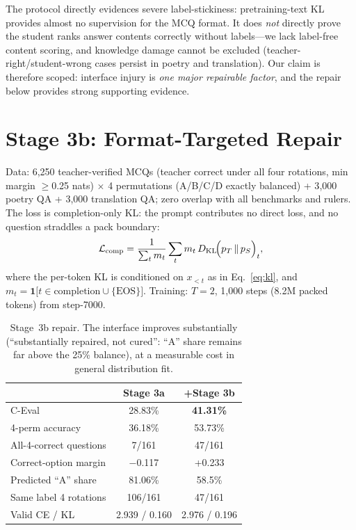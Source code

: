 \documentclass[11pt]{article}
\begin{document}
The protocol directly evidences severe label-stickiness: pretraining-text
KL provides almost no supervision for the MCQ format. It does
\emph{not} directly prove the student ranks answer contents correctly
without labels---we lack label-free content scoring, and knowledge
damage cannot be excluded (teacher-right/student-wrong cases persist in
poetry and translation). Our claim is therefore scoped: interface injury
is \emph{one major repairable factor}, and the repair below provides
strong supporting evidence.

\section{Stage 3b: Format-Targeted Repair}
\label{sec:stage3b}

Data: 6{,}250 teacher-verified MCQs (teacher correct under all four
rotations, min margin $\ge$0.25 nats) $\times$ 4 permutations (A/B/C/D
exactly balanced) + 3{,}000 poetry QA + 3{,}000 translation QA; zero
overlap with all benchmarks and rulers. The loss is completion-only KL:
the prompt contributes no direct loss, and no question straddles a pack
boundary:
\begin{equation}
\mathcal{L}_{\mathrm{comp}} = \frac{1}{\sum_t m_t} \sum_t m_t\, D_{\mathrm{KL}}\!\Bigl(p_T \,\|\, p_S\Bigr)_t,
\label{eq:comp}
\end{equation}
where the per-token KL is conditioned on $x_{<t}$ as in
Eq.~\eqref{eq:kl}, and
$m_t = \mathbf{1}\bigl[t \in \text{completion} \cup \{\mathrm{EOS}\}\bigr]$.
Training: $T{=}2$, 1{,}000 steps (8.2M packed tokens) from step-7000.

\begin{table}[t]
\centering
\small
\begin{tabular}{@{}lcc@{}}
\toprule
 & Stage 3a & +Stage 3b \\
\midrule
C-Eval & 28.83\% & \textbf{41.31\%} \\
4-perm accuracy & 36.18\% & 53.73\% \\
All-4-correct questions & 7/161 & 47/161 \\
Correct-option margin & $-$0.117 & +0.233 \\
Predicted ``A'' share & 81.06\% & 58.5\% \\
Same label 4 rotations & 106/161 & 47/161 \\
Valid CE / KL & 2.939 / 0.160 & 2.976 / 0.196 \\
\bottomrule
\end{tabular}
\caption{Stage~3b repair. The interface improves substantially
(``substantially repaired, not cured'': ``A'' share remains far above
the 25\% balance), at a measurable cost in general distribution fit.}
\label{tab:stage3b}
\end{table}
\end{document}
